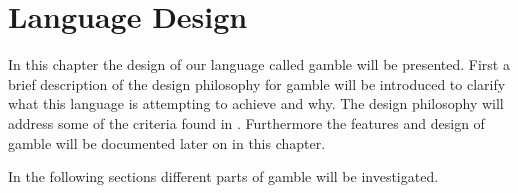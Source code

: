 \chapter{Language Design}
\label{cha:language_design}
In this chapter the design of our language called \gls{gamble} will be presented.
First a brief description of the design philosophy for \gls{gamble} will be introduced to clarify what this language is attempting to achieve and why.
The design philosophy will address some of the criteria found in .
Furthermore the features and design of \gls{gamble} will be documented later on in this chapter.



In the following sections different parts of \gls{gamble} will be investigated.











